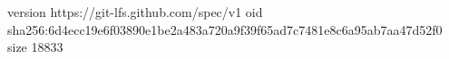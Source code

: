 version https://git-lfs.github.com/spec/v1
oid sha256:6d4ecc19e6f03890e1be2a483a720a9f39f65ad7c7481e8c6a95ab7aa47d52f0
size 18833
